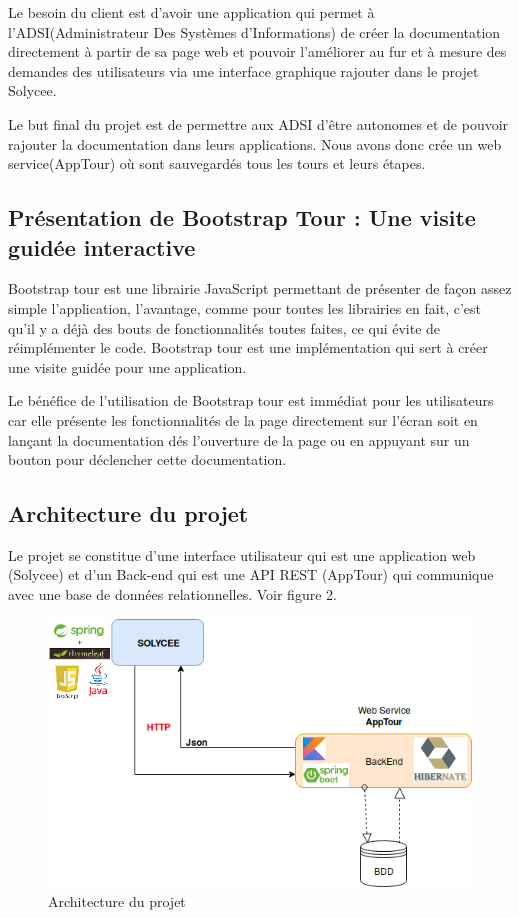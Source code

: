 \documentclass[12pt]{article}
\begin{document}
Le besoin du client est d'avoir une application qui permet à l'ADSI(Administrateur Des Systèmes d'Informations) de créer la documentation directement à partir de sa page web et pouvoir l'améliorer au fur et à mesure des demandes des utilisateurs via une interface graphique rajouter dans le projet Solycee. 


Le but final du projet est de permettre aux ADSI d'être autonomes et de pouvoir rajouter la documentation dans leurs applications. Nous avons donc crée un web service(AppTour) où sont sauvegardés tous les tours et leurs étapes.
 
\subsection{Présentation de Bootstrap Tour : Une visite guidée interactive}
 
Bootstrap tour est une librairie JavaScript permettant de présenter de façon assez simple l’application, l’avantage, comme pour toutes les librairies en fait, c’est qu’il y a déjà des bouts de fonctionnalités toutes faites, ce qui évite de réimplémenter le code. Bootstrap tour est une implémentation qui sert à créer une visite guidée pour une application.

Le bénéfice de l'utilisation de Bootstrap tour est immédiat pour les utilisateurs car elle présente les fonctionnalités de la page directement sur l'écran soit en lançant la documentation  dés l'ouverture de la page ou en appuyant sur un bouton pour déclencher cette documentation.


\subsection{Architecture du projet}

Le projet se constitue d'une interface utilisateur qui est une application web (Solycee) et d'un Back-end qui est une API REST (AppTour) qui communique avec une base de données relationnelles. Voir figure 2.


\begin{figure}[H]
	\centering
 		\includegraphics[width=1\textwidth]{diagrammes/ArchitectureGenerale.png}
  		\caption{Architecture du projet}
	\end{figure}
\end{document}
